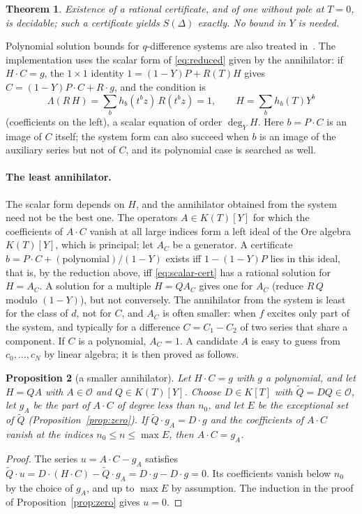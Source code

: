 \documentclass[11pt,a4paper]{article}
\newcommand{\Op}{\mathcal O}
\theoremstyle{plain}
\newtheorem{theorem}{Theorem}[section]
\newtheorem{proposition}[theorem]{Proposition}
\theoremstyle{definition}
\theoremstyle{remark}
\begin{document}
\begin{theorem}\label{thm:decidable}
Existence of a rational certificate, and of one without pole at $T=0$, is
decidable; such a certificate yields $S(\Delta)$ exactly. No bound in $Y$ is
needed.
\end{theorem}

Polynomial solution bounds for $q$-difference systems are also treated
in~\cite{Middeke}. The implementation uses the scalar form of
\eqref{eq:reduced} given by the annihilator: if $H\cdot C=g$, the $1\times1$
identity $1=(1-Y)P+R(T)H$ gives $C=(1-Y)P\cdot C+R\cdot g$, and the condition is
\begin{equation}\label{eq:scalar-cert}
  \Lambda(R\,H)=\sum_bh_b(t^bz)\,R(t^bz)=1,\qquad H=\sum_bh_b(T)Y^b
\end{equation}
(coefficients on the left), a scalar equation of order $\deg_YH$. Here
$b=P\cdot C$ is an image of $C$ itself; the system form can also succeed when
$b$ is an image of the auxiliary series but not of $C$, and its polynomial case
is searched as well.

\paragraph{The least annihilator.} The scalar form depends on $H$, and the
annihilator obtained from the system need not be the best one. The operators
$A\in K(T)[Y]$ for which the coefficients of $A\cdot C$ vanish at all large
indices form a left ideal of the Ore algebra $K(T)[Y]$, which is principal; let
$A_C$ be a generator. A certificate
$b=P\cdot C+(\text{polynomial})/(1-Y)$ exists iff $1-(1-Y)P$ lies in this ideal,
that is, by the reduction above, iff \eqref{eq:scalar-cert} has a rational
solution for $H=A_C$. A solution for a multiple $H=QA_C$ gives one for $A_C$
(reduce $R\,Q$ modulo $(1-Y)$), but not conversely. The annihilator from the
system is least for the class of $d$, not for $C$, and $A_C$ is often smaller:
when $f$ excites only part of the system, and typically for a difference
$C=C_1-C_2$ of two series that share a component. If $C$ is a polynomial,
$A_C=1$. A candidate $A$ is easy to guess from $c_0,\dots,c_N$ by linear
algebra; it is then proved as follows.

\begin{proposition}[a smaller annihilator]\label{prop:factor}
Let $H\cdot C=g$ with $g$ a polynomial, and let $H=QA$ with $A\in\Op$ and
$Q\in K(T)[Y]$. Choose $D\in K[T]$ with $\widetilde Q=DQ\in\Op$, let $g_A$ be
the part of $A\cdot C$ of degree less than $n_0$, and let $E$ be the exceptional
set of $\widetilde Q$ (Proposition~\ref{prop:zero}). If $\widetilde Q\cdot g_A=D\cdot g$ and the
coefficients of $A\cdot C$ vanish at the indices $n_0\le n\le\max E$, then
$A\cdot C=g_A$.
\end{proposition}
\begin{proof}
The series $u=A\cdot C-g_A$ satisfies
$\widetilde Q\cdot u=D\cdot(H\cdot C)-\widetilde Q\cdot g_A=D\cdot g-D\cdot g=0$.
Its coefficients vanish below $n_0$ by the choice of $g_A$, and up to $\max E$
by assumption. The induction in the proof of Proposition~\ref{prop:zero} gives
$u=0$.
\end{proof}
\end{document}
